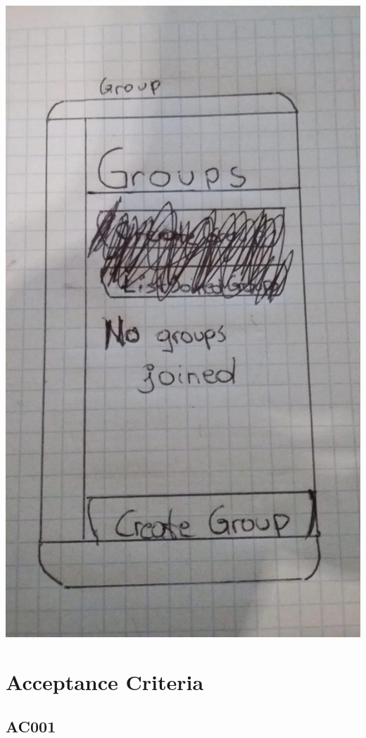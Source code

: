 \documentclass[12pt]{article}
\theoremstyle{definition}
\begin{document}
\includegraphics[scale=.2]{group.jpeg}

\pagebreak


\section{Acceptance Criteria}

\subsection{AC001}
\end{document}
